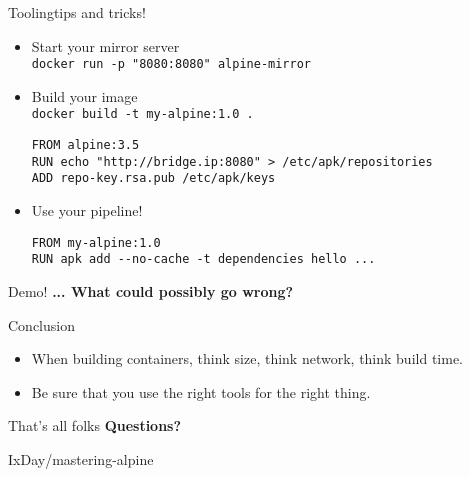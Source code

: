 \documentclass[aspectratio=169]{beamer}
\begin{document}
\begin{frame}[fragile]{Tooling}{tips and tricks!}
  \begin{itemize}
\item Start your mirror server\\
      \texttt{docker run -p "8080:8080" alpine-mirror}
    \item Build your image \\ \texttt{docker build -t my-alpine:1.0 .}
      \begin{verbatim}
FROM alpine:3.5
RUN echo "http://bridge.ip:8080" > /etc/apk/repositories
ADD repo-key.rsa.pub /etc/apk/keys
      \end{verbatim}

    \item Use your pipeline!
      \begin{verbatim}
FROM my-alpine:1.0
RUN apk add --no-cache -t dependencies hello ...
      \end{verbatim}

  \end{itemize}

\end{frame}

\begin{frame}{Demo!}
  \LARGE \textbf{... What could possibly go wrong?}
\end{frame}

\begin{frame}{Conclusion}
\begin{itemize}
\item When building containers, think size, think network, think build time.
\end{itemize}

  \begin{itemize}
    \item Be sure that you use the right tools for the right thing.
  \end{itemize}
\end{frame}

\begin{frame}{That's all folks}
  \LARGE \textbf{Questions?}

  \begin{flushright}
    \normalsize \color{Green}IxDay\color{Grey}/mastering-alpine
   \end{flushright}
\end{frame}
\end{document}
